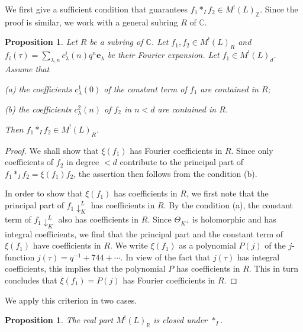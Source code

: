 \documentclass[12pt]{amsart}
\numberwithin{equation}{section}
\newtheorem{proposition}[theorem]{Proposition}
\theoremstyle{definition}
\theoremstyle{remark}
\newcommand{\R}{\mathbb{R}}
\newcommand{\C}{\mathbb{C}}
\newcommand{\elambda}{{\mathbf e}_{\lambda}}
\newcommand{\pushLK}{\downarrow^{L}_{K}}
\newcommand{\ThetaK}{\Theta_{K^{+}}}
\newcommand{\MLZ}{M^{!}(L)_{\mathbb{Z}}}
\begin{document}
We first give a sufficient condition that guarantees $f_{1}\ast_{I}f_{2}\in {\MLZ}$. 
Since the proof is similar, we work with a general subring $R$ of ${\C}$. 

\begin{proposition}\label{prop: criterion}
Let $R$ be a subring of ${\C}$. 
Let $f_{1}, f_{2}\in M^!(L)_{R}$ and 
$f_{i}(\tau) = \sum_{\lambda, n}c_{\lambda}^{i}(n)q^{n}{\elambda}$ 
be their Fourier expansion. 
Let $f_{1}\in M^!(L)_{d}$. 
Assume that 

(a) the coefficients $c_{\lambda}^{1}(0)$ of the constant term of $f_{1}$ are contained in $R$; 

(b) the coefficients $c_{\lambda}^{2}(n)$ of $f_{2}$ in  $n< d$ are contained in $R$. 

\noindent
Then $f_{1}\ast_{I}f_{2}\in M^!(L)_{R}$. 
\end{proposition}

\begin{proof}
 
We shall show that $\xi(f_{1})$ has Fourier coefficients in $R$. 
Since only coefficients of $f_{2}$ in degree $<d$ 
contribute to the principal part of $f_{1}\ast_{I}f_{2}=\xi(f_{1})f_{2}$, 
the assertion then follows from the condition (b). 

In order to show that $\xi(f_{1})$ has coefficients in $R$, 
we first note that the principal part of $f_{1}{\pushLK}$ has coefficients in $R$. 
By the condition (a), the constant term of $f_{1}{\pushLK}$ also has coefficients in $R$. 
Since ${\ThetaK}$ is holomorphic and has integral coefficients, 
we find that the principal part and the constant term of $\xi(f_{1})$ have coefficients in $R$. 
We write $\xi(f_{1})$ as a polynomial $P(j)$ of the $j$-function  
$j(\tau)=q^{-1}+744+\cdots$. 
In view of the fact that 
$j(\tau)$ has integral coefficients, 
this implies that the polynomial $P$ has coefficients in $R$. 
This in turn concludes that $\xi(f_{1})=P(j)$ has Fourier coefficients in $R$. 
\end{proof}


We apply this criterion in two cases. 

\begin{proposition}\label{prop: real}
The real part $M^{!}(L)_{{\R}}$ is closed under $\ast_{I}$. 
\end{proposition}
\end{document}
